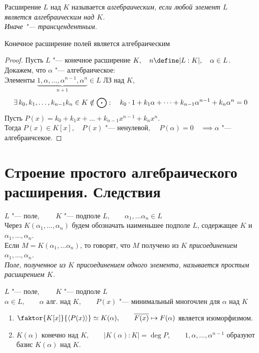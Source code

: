 \begin{definition}
	Расширение $ L $ над $ K $ называется \it{алгебраическим}, если любой элемент $ L $ является алгебраическим над $ K $. \\
	Иначе "--- \it{трансцендентным}.
\end{definition}

\begin{theorem}
	Конечное расширение полей является алгебраическим
\end{theorem}

\begin{proof}
	Пусть $ L $ "--- конечное расширение $ K, \quad n \define |L : K|, \quad \alpha \in L $. \\
	Докажем, что $ \alpha $ "--- алгебраическое: \\
	Элементы $ \underbrace{1, \alpha, \dots, \alpha^{n - 1}, \alpha^n}_{n + 1} \in L $ ЛЗ над $ K $, \ie
	$$ \exists\, k_0, k_1, \dots, k_{n - 1} k_n \in K \notin \bigodot : \quad k_0 \cdot 1 + k_1 \alpha + \dots + k_{n - 1}\alpha^{n - 1} + k_n\alpha^n = 0 $$
	Пусть $ P(x) = k_0 + k_1x + \dots + k_{n - 1}x^{n - 1} + k_nx^n $. \\
	Тогда $ P(x) \in K[x], \quad P(x) $ "--- ненулевой, $ \quad P(\alpha) = 0 \quad \implies \alpha $ "--- алгебраичсекое.
\end{proof}

\section{Строение простого алгебраического расширения. Следствия}

\begin{definition}
	$ L $ "--- поле, $ \qquad K $ "--- подполе $ L, \qquad \alpha_1, \dots \alpha_n \in L $ \\
	Через $ K(\alpha_1, \dots, \alpha_n) $ будем обозначать наименьшее подполе $ L $, содержащее $ K $ и $ \alpha_1, \dots, \alpha_n $. \\
	Если $ M = K(\alpha_1, \dots \alpha_n) $, то говорят, что $ M $ получено из $ K $ \it{присоединением} $ \alpha_1, \dots, \alpha_n $. \\
	Поле, полученное из $ K $ присоединением одного элемента, называется \it{простым расширением} $ K $.
\end{definition}

\begin{theorem}
	$ L $ "--- поле, $ \qquad K $ "--- подполе $ L $ \\
	$ \alpha \in L, \qquad \alpha $ алг. над $ K, \qquad P(x) $ "--- минимальный многочлен для $ \alpha $ над $ K $
	\begin{enumerate}
		\item $ \faktor{K[x]}{\braket{P(x)}} \simeq K(\alpha), \qquad \ol{F(x)} \mapsto F(\alpha) $ является изоморфизмом.
		\item $ K(\alpha) $ конечно над $ K, \qquad |K(\alpha) : K| = \deg P, \qquad 1, \alpha, \dots, \alpha^{n - 1} $ образуют базис $ K(\alpha) $ над $ K $.
	\end{enumerate}
\end{theorem}


